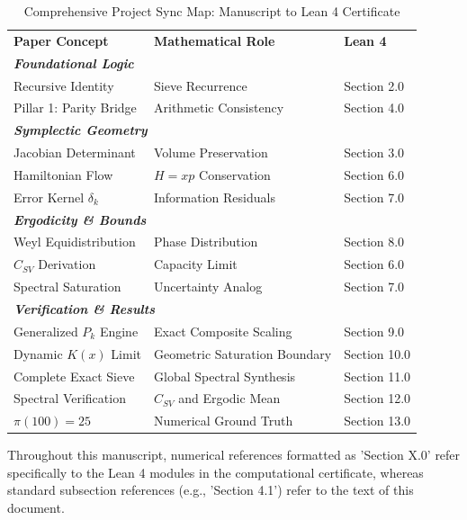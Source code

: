 \documentclass[sn-mathphys-num, pdflatex, referee]{sn-jnl}
\begin{document}
\begin{table}[ht]
\small
\centering
\caption{Comprehensive Project Sync Map: Manuscript to Lean 4 Certificate}
\label{table:mapping}
\renewcommand{\arraystretch}{1.2}
\setlength{\tabcolsep}{0pt} 
\begin{tabular}{p{4.5cm} p{5.0cm} p{2.5cm}} 
\toprule
\textbf{Paper Concept} & \textbf{Mathematical Role} & \textbf{Lean 4} \\  
\cmidrule(r{1.5cm}){1-3} 
\multicolumn{3}{l}{\textit{\textbf{Foundational Logic}}} \\
Recursive Identity & Sieve Recurrence & Section 2.0 \\
Pillar 1: Parity Bridge & Arithmetic Consistency & Section 4.0 \\ 
\cmidrule(r{1.5cm}){1-3}
\multicolumn{3}{l}{\textit{\textbf{Symplectic Geometry}}} \\
Jacobian Determinant & Volume Preservation & Section 3.0 \\
Hamiltonian Flow & $H=xp$ Conservation & Section 6.0 \\
Error Kernel $\delta_k$ & Information Residuals & Section 7.0 \\ 
\cmidrule(r{1.5cm}){1-3}
\multicolumn{3}{l}{\textit{\textbf{Ergodicity \& Bounds}}} \\
Weyl Equidistribution & Phase Distribution & Section 8.0 \\
$C_{SV}$ Derivation & Capacity Limit & Section 6.0 \\
Spectral Saturation & Uncertainty Analog & Section 7.0 \\ 
\cmidrule(r{1.5cm}){1-3}
\multicolumn{3}{l}{\textit{\textbf{Verification \& Results}}} \\
Generalized $P_k$ Engine & Exact Composite Scaling & Section 9.0 \\
Dynamic $K(x)$ Limit & Geometric Saturation Boundary & Section 10.0 \\
Complete Exact Sieve & Global Spectral Synthesis & Section 11.0 \\
Spectral Verification & $C_{SV}$ and Ergodic Mean & Section 12.0 \\
$\pi(100) = 25$ & Numerical Ground Truth & Section 13.0 \\
\bottomrule
\end{tabular}
\end{table}

Throughout this manuscript, numerical references formatted as 'Section X.0' refer specifically to the Lean 4 modules in the computational certificate, whereas standard subsection references (e.g., 'Section 4.1') refer to the text of this document.
\end{document}
